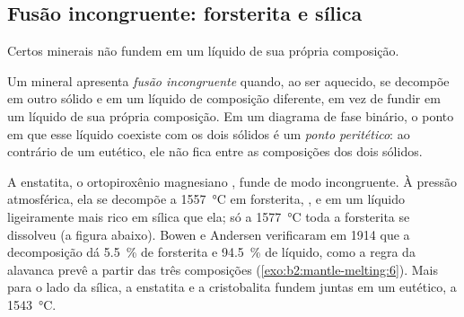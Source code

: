 \subsection*{Fusão incongruente: forsterita e sílica}

Certos minerais não fundem em um líquido de sua própria composição.

\begin{definition}\label{def:b2:mantle-melting:peritectic}
Um mineral apresenta \emph{fusão incongruente} quando, ao ser
aquecido, se decompõe em outro sólido e em um líquido de composição diferente,
em vez de fundir em um líquido de sua própria composição. Em um diagrama de fase
binário, o ponto em que esse líquido coexiste com os dois sólidos é um
\emph{ponto peritético}: ao contrário de um eutético, ele não fica
entre as composições dos dois sólidos.
\end{definition}

A enstatita, o ortopiroxênio magnesiano , funde de modo incongruente. À
pressão atmosférica, ela se decompõe a \qty{1557}{\celsius} em forsterita,
, e em um líquido ligeiramente mais rico em sílica que ela; só a
\qty{1577}{\celsius} toda a forsterita se dissolveu (a figura abaixo). Bowen
e Andersen verificaram em 1914 que a decomposição dá \qty{5.5}{\percent} de
forsterita e \qty{94.5}{\percent} de líquido, como a regra da alavanca prevê a partir
das três composições (\cref{exo:b2:mantle-melting:6}). Mais para o lado da sílica, a enstatita e a
cristobalita fundem juntas em um eutético, a \qty{1543}{\celsius}.

